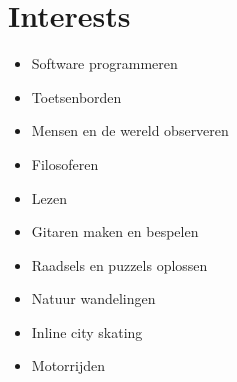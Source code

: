 \documentclass[]{friggeri-cv} %
\begin{document}

\section{Interests}

\begin{multicols}{2}
   \begin{itemize}
      \item Software programmeren
      \item Toetsenborden
      \item Mensen en de wereld observeren
      \item Filosoferen
      \item Lezen
      \item Gitaren maken en bespelen
      \item Raadsels en puzzels oplossen
      \item Natuur wandelingen
      \item Inline city skating
      \item Motorrijden
   \end{itemize}
\end{multicols}


\end{document}
